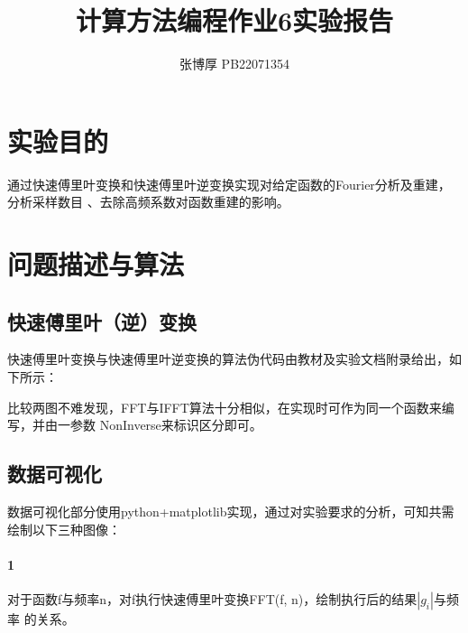 \documentclass[12pt,a4paper,oneside]{article}
\title{计算方法编程作业6实验报告}
\author{张博厚 PB22071354}
\date{}
\begin{document}
\maketitle
\section{实验目的}
通过快速傅里叶变换和快速傅里叶逆变换实现对给定函数的Fourier分析及重建，分析采样数目
、去除高频系数对函数重建的影响。


\section{问题描述与算法}
\subsection{快速傅里叶（逆）变换}
快速傅里叶变换与快速傅里叶逆变换的算法伪代码由教材及实验文档附录给出，如下所示：
\begin{figure}[H]
    \centering
\end{figure}
比较两图不难发现，FFT与IFFT算法十分相似，在实现时可作为同一个函数来编写，并由一参数
NonInverse来标识区分即可。

\subsection{数据可视化}
数据可视化部分使用python+matplotlib实现，通过对实验要求的分析，可知共需绘制以下三种图像：
\paragraph{1} 对于函数f与频率n，对f执行快速傅里叶变换FFT(f, n)，绘制执行后的结果$|g_i|$与频率
的关系。
\end{document}
